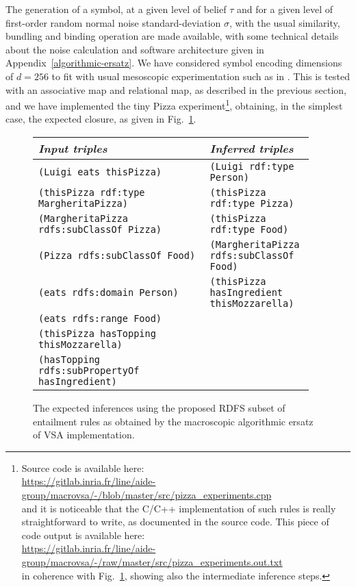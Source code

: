 \documentclass[sn-mathphys]{sn-jnl}
\newcommand{\hhref}[1]{\href{#1}{#1}}
\begin{document}
The generation of a symbol, at a given level of belief $\tau$ and for a given level of first-order random normal noise standard-deviation $\sigma$, with the usual similarity, bundling and binding operation are made available, with some technical details about the noise calculation and software architecture given in Appendix~\ref{algorithmic-ersatz}. We have considered symbol encoding dimensions of $d=256$ to fit with usual mesoscopic experimentation such as in \cite{mercier_ontology_2021}. This is tested with an associative map and relational map, as described in the previous section, and we have implemented the tiny Pizza experiment\footnote{Source code is available here: \\ \hhref{https://gitlab.inria.fr/line/aide-group/macrovsa/-/blob/master/src/pizza_experiments.cpp} \\ and it is noticeable that the C/C++ implementation of such rules is really straightforward to write, as documented in the source code. This piece of code output is available here: \\ \hhref{https://gitlab.inria.fr/line/aide-group/macrovsa/-/raw/master/src/pizza_experiments.out.txt} \\ in coherence with Fig.~\ref{result0}, showing also the intermediate inference steps.}, obtaining, in the simplest case, the expected closure, as given in Fig.~\ref{result0}.

\begin{figure}[htb]
\begin{center}\begin{tabular}{| p{0.60\linewidth} | p{0.35\linewidth} |}
    {\em Input triples}                            & {\em Inferred triples} \\
\hline
  {\small\tt (Luigi eats thisPizza)}                      & {\small\tt (Luigi rdf:type Person)} \\
  {\small\tt (thisPizza rdf:type MargheritaPizza)}        & {\small\tt (thisPizza rdf:type Pizza)} \\
  {\small\tt (MargheritaPizza rdfs:subClassOf Pizza)}      & {\small\tt (thisPizza rdf:type Food)} \\
  {\small\tt (Pizza rdfs:subClassOf Food)}                & {\small\tt (MargheritaPizza rdfs:subClassOf Food)} \\
  {\small\tt (eats rdfs:domain Person)}                   &  {\small\tt (thisPizza hasIngredient thisMozzarella)}\\
  {\small\tt (eats rdfs:range Food)}                      &\\
  {\small\tt (thisPizza hasTopping thisMozzarella)}       &\\
  {\small\tt (hasTopping rdfs:subPropertyOf hasIngredient)} &\\
  \hline \end{tabular}\end{center}
\caption{The expected inferences using the proposed RDFS subset of entailment rules as obtained by
  the macroscopic algorithmic ersatz of VSA implementation.}
\label{result0}
\end{figure}
\end{document}
